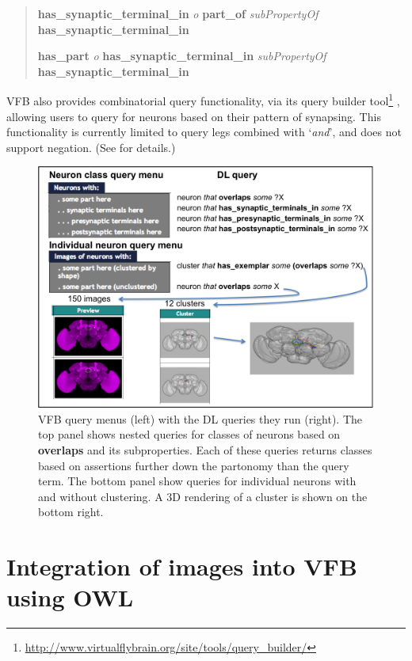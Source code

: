 \documentclass[runningheads,a4paper]{llncs}
\begin{document}
\begin{quote}
\textbf{has\_synaptic\_terminal\_in} \textit{o} \textbf{part\_of} \textit{subPropertyOf}
\textbf{has\_synaptic\_terminal\_in}

\textbf{has\_part} \textit{o} \textbf{has\_synaptic\_terminal\_in} \textit{subPropertyOf}
\textbf{has\_synaptic\_terminal\_in}
\end{quote}

VFB also provides combinatorial query functionality, via its
query builder
tool\footnote{\url{http://www.virtualflybrain.org/site/tools/query_builder/}}
,
allowing users to query for neurons based on their pattern of
synapsing.  This functionality is currently limited to query legs
combined with `\textit {and}', and does not support negation.
(See \cite{pmid22402613} for details.)

\begin{figure}
\centering
\includegraphics[width=120mm]{images/Query_menus_DL_images.png}
\caption{VFB query menus (left) with the DL queries they run (right).  The top panel
  shows nested queries for classes of neurons based on \textbf{overlaps} and its
  subproperties.  Each of these queries returns classes based on
  assertions further down the partonomy than the query term.  The
  bottom panel show queries for individual neurons with and without
  clustering.  A 3D rendering of a cluster is shown on the bottom right. }
\label{fig:Query_menus_DL_images}
\end{figure}

\section{Integration of images into VFB using OWL}
\end{document}
